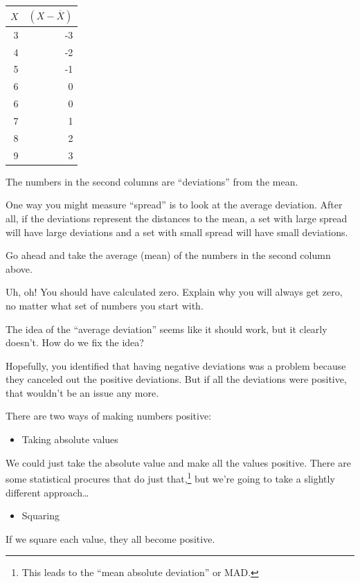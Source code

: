 \documentclass[
]{book}
\providecommand{\tightlist}{%
  \setlength{\itemsep}{0pt}\setlength{\parskip}{0pt}}
\begin{document}
\begin{longtable}[]{@{}rr@{}}
\toprule
\(X\) & \(\left(X - \overline{X}\right)\) \\
\midrule
\endhead
3 & -3 \\
4 & -2 \\
5 & -1 \\
6 & 0 \\
6 & 0 \\
7 & 1 \\
8 & 2 \\
9 & 3 \\
\bottomrule
\end{longtable}

The numbers in the second columns are ``deviations'' from the mean.

One way you might measure ``spread'' is to look at the average deviation. After all, if the deviations represent the distances to the mean, a set with large spread will have large deviations and a set with small spread will have small deviations.

Go ahead and take the average (mean) of the numbers in the second column above.

Uh, oh! You should have calculated zero. Explain why you will always get zero, no matter what set of numbers you start with.

The idea of the ``average deviation'' seems like it should work, but it clearly doesn't. How do we fix the idea?

Hopefully, you identified that having negative deviations was a problem because they canceled out the positive deviations. But if all the deviations were positive, that wouldn't be an issue any more.

There are two ways of making numbers positive:

\begin{itemize}
\tightlist
\item
  Taking absolute values
\end{itemize}

We could just take the absolute value and make all the values positive. There are some statistical procures that do just that,\footnote{This leads to the ``mean absolute deviation'' or MAD.} but we're going to take a slightly different approach\ldots{}

\begin{itemize}
\tightlist
\item
  Squaring
\end{itemize}

If we square each value, they all become positive.
\end{document}
